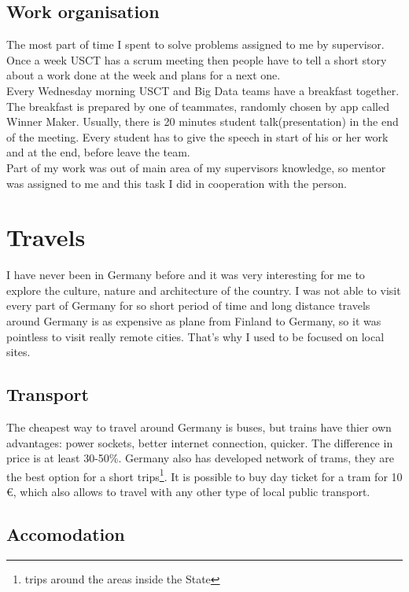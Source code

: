 \documentclass[english]{article}
\begin{document}
\subsection{Work organisation}

The most part of time I spent to solve problems assigned to me by supervisor. Once a week USCT has a scrum meeting then people have to tell a short story about a work done at the week and plans for a next one.\\

Every Wednesday morning USCT and Big Data teams have a breakfast together. The breakfast is prepared by one of teammates, randomly chosen by app called Winner Maker. Usually, there is 20 minutes student talk(presentation) in the end of the meeting. Every student has to give the speech in start of his or her work and at the end, before leave the team.\\

Part of my work was out of main area of my supervisors knowledge, so mentor was assigned to me and this task I did in cooperation with the person.

\section{Travels}

I have never been in Germany before and it was very interesting for me to explore the culture, nature and architecture of the country. I was not able to visit every part of Germany for so short period of time and long distance travels around Germany is as expensive as plane from Finland to Germany, so it was pointless to visit really remote cities. That's why I used to be focused on local sites.

\subsection{Transport}

The cheapest way to travel around Germany is buses, but trains have thier own advantages: power sockets, better internet connection, quicker. The difference in price is at least 30-50\%. Germany also has developed network of trams, they are the best option for a short trips\footnote{trips around the areas inside the State}. It is possible to buy day ticket for a tram for 10 \euro, which also allows to travel with any other type of local public transport.

\subsection{Accomodation}
\end{document}
